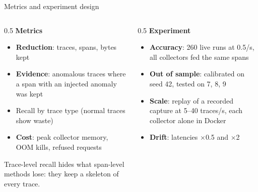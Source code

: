 \documentclass[aspectratio=169,11pt]{beamer}
\begin{document}
\begin{frame}{Metrics and experiment design}
  \begin{columns}[T]
    \begin{column}{0.5\textwidth}
      \textbf{Metrics}
      \begin{itemize}
        \item \textbf{Reduction}: traces, spans, bytes kept
        \item \textbf{Evidence}: anomalous traces where a span with an injected anomaly was kept
        \item Recall by trace type (normal traces show waste)
        \item \textbf{Cost}: peak collector memory, OOM kills, refused requests
      \end{itemize}
      Trace-level recall hides what span-level methods lose: they keep a skeleton of every trace.
    \end{column}
    \begin{column}{0.5\textwidth}
      \textbf{Experiment}
      \begin{itemize}
        \item \textbf{Accuracy}: 260 live runs at 0.5/s, all collectors fed the same spans
        \item \textbf{Out of sample}: calibrated on seed 42, tested on 7, 8, 9
        \item \textbf{Scale}: replay of a recorded capture at 5--40 traces/s, each collector alone in Docker
        \item \textbf{Drift}: latencies $\times$0.5 and $\times$2
      \end{itemize}
    \end{column}
  \end{columns}

\end{frame}
\end{document}

